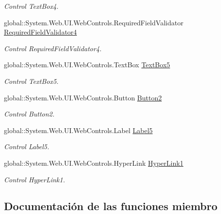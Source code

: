 \begin{DoxyCompactItemize}
\begin{DoxyCompactList}\small\item\em Control Text\+Box4. \end{DoxyCompactList}\item 
global\+::\+System.\+Web.\+U\+I.\+Web\+Controls.\+Required\+Field\+Validator \mbox{\hyperlink{classInicio_1_1CambiarPassword_a721210b960d80ff7c87c392dc8f4d78a}{Required\+Field\+Validator4}}
\begin{DoxyCompactList}\small\item\em Control Required\+Field\+Validator4. \end{DoxyCompactList}\item 
global\+::\+System.\+Web.\+U\+I.\+Web\+Controls.\+Text\+Box \mbox{\hyperlink{classInicio_1_1CambiarPassword_a852585bbaa846d9076125c13ca2ad786}{Text\+Box5}}
\begin{DoxyCompactList}\small\item\em Control Text\+Box5. \end{DoxyCompactList}\item 
global\+::\+System.\+Web.\+U\+I.\+Web\+Controls.\+Button \mbox{\hyperlink{classInicio_1_1CambiarPassword_ab2a855fe05cc706ac07c6308af3dcc54}{Button2}}
\begin{DoxyCompactList}\small\item\em Control Button2. \end{DoxyCompactList}\item 
global\+::\+System.\+Web.\+U\+I.\+Web\+Controls.\+Label \mbox{\hyperlink{classInicio_1_1CambiarPassword_adabacc9becc23ab2219428532387a3b0}{Label5}}
\begin{DoxyCompactList}\small\item\em Control Label5. \end{DoxyCompactList}\item 
global\+::\+System.\+Web.\+U\+I.\+Web\+Controls.\+Hyper\+Link \mbox{\hyperlink{classInicio_1_1CambiarPassword_a54fe9058b0b1415263161ac543de2e4f}{Hyper\+Link1}}
\begin{DoxyCompactList}\small\item\em Control Hyper\+Link1. \end{DoxyCompactList}\end{DoxyCompactItemize}


\subsection{Documentación de las funciones miembro}
\mbox{\label{classInicio_1_1CambiarPassword_a59bb43a3c0865c4c403c30cf49bc5381}} 
